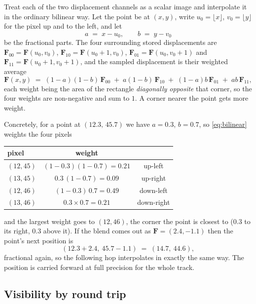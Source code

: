 \documentclass[11pt,a4paper]{article}
\begin{document}
Treat each of the two displacement channels as a scalar image and interpolate it
in the ordinary bilinear way. Let the point be at $(x,y)$, write
$u_0=\lfloor x\rfloor$, $v_0=\lfloor y\rfloor$ for the pixel up and to the left,
and let
\begin{equation}
  a \;=\; x-u_0, \qquad b \;=\; y-v_0
\end{equation}
be the fractional parts. The four surrounding stored displacements are
$\bm{F}_{00}=\bm{F}(u_0,v_0)$, $\bm{F}_{10}=\bm{F}(u_0{+}1,v_0)$,
$\bm{F}_{01}=\bm{F}(u_0,v_0{+}1)$ and $\bm{F}_{11}=\bm{F}(u_0{+}1,v_0{+}1)$, and
the sampled displacement is their weighted average
\begin{equation}\label{eq:bilinear}
  \bm{F}(x,y) \;=\;
    (1{-}a)(1{-}b)\,\bm{F}_{00} \;+\; a(1{-}b)\,\bm{F}_{10}
    \;+\; (1{-}a)b\,\bm{F}_{01} \;+\; ab\,\bm{F}_{11},
\end{equation}
each weight being the area of the rectangle \emph{diagonally opposite} that
corner, so the four weights are non-negative and sum to $1$. A corner nearer the
point gets more weight.

Concretely, for a point at $(12.3,\,45.7)$ we have $a=0.3$, $b=0.7$, so
\eqref{eq:bilinear} weights the four pixels
\begin{center}
\begin{tabular}{lcc}
\toprule
pixel & weight & \\
\midrule
$(12,45)$ & $(1{-}0.3)(1{-}0.7) = 0.21$ & up-left \\
$(13,45)$ & $0.3\,(1{-}0.7) = 0.09$     & up-right \\
$(12,46)$ & $(1{-}0.3)\,0.7 = 0.49$     & down-left \\
$(13,46)$ & $0.3\times0.7 = 0.21$       & down-right \\
\bottomrule
\end{tabular}
\end{center}
and the largest weight goes to $(12,46)$, the corner the point is closest to
($0.3$ to its right, $0.3$ above it). If the blend comes out as
$\bm{F}=(2.4,-1.1)$ then the point's next position is
\begin{equation*}
  (12.3+2.4,\ 45.7-1.1) \;=\; (14.7,\ 44.6),
\end{equation*}
fractional again, so the following hop interpolates in exactly the same way. The
position is carried forward at full precision for the whole track.

\subsection{Visibility by round trip}
\end{document}
